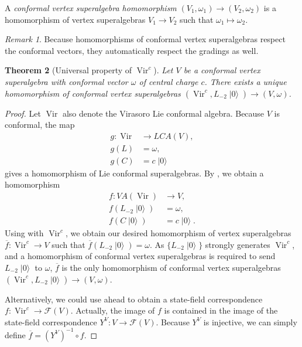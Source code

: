 \documentclass[a4paper, 12pt, reqno]{amsart}
\newtheorem{theorem}{Theorem}[section]
\theoremstyle{remark}
\newtheorem{remark}[theorem]{Remark}
\DeclareMathOperator{\Vir}{Vir}
\DeclareMathOperator{\vac}{|0\rangle}
\begin{document}
A \emph{conformal vertex superalgebra homomorphism} $(V_1, \omega_1) \to (V_2, \omega_2)$ is a homomorphism of vertex superalgebras $V_1 \to V_2$ such that $\omega_1 \mapsto \omega_2$.

\begin{remark}
  \label{rmk:20}
  Because homomorphisms of conformal vertex superalgebras respect the conformal vectors, they automatically respect the gradings as well.
\end{remark}

\begin{theorem}[Universal property of $\Vir^c$]
  \label{thr:22}
  Let $V$ be a conformal vertex superalgebra with conformal vector $\omega$ of central charge $c$.
  There exists a unique homomorphism of conformal vertex superalgebras $(\Vir^c, L_{-2}\vac) \to (V, \omega)$.
\end{theorem}

\begin{proof}
  Let $\Vir$ also denote the Virasoro Lie conformal algebra.
  Because $V$ is conformal, the map
  \begin{align*}
    g: \Vir &\to LCA(V), \\
    g(L) &= \omega, \\
    g(C) &= c\vac
  \end{align*}
  gives a homomorphism of Lie conformal superalgebras.
  By , we obtain a homomorphism
  \begin{align*}
    f: VA(\Vir) &\to V, \\
    f(L_{-2}\vac) &= \omega, \\
    f(C\vac) &= c\vac.
  \end{align*}
  Using  with $\Vir^c$, we obtain our desired homomorphism of vertex superalgebras $\overline{f}: \Vir^c \to V$ such that $\overline{f}(L_{-2}\vac) = \omega$.
  As $\{L_{-2}\vac\}$ strongly generates $\Vir^c$, and a homomorphism of conformal vertex superalgebras is required to send $L_{-2}\vac$ to $\omega$, $\overline{f}$ is the only homomorphism of conformal vertex superalgebras $(\Vir^c, L_{-2}\vac) \to (V, \omega)$.

  Alternatively, we could use  ahead to obtain a state-field correspondence $f: \Vir^c \to \mathcal{F}(V)$.
  Actually, the image of $f$ is contained in the image of the state-field correspondence $Y^V: V \to \mathcal{F}(V)$.
  Because $Y^V$ is injective, we can simply define $\overline{f} = (Y^V)^{-1}\circ f$.
\end{proof}
\end{document}
